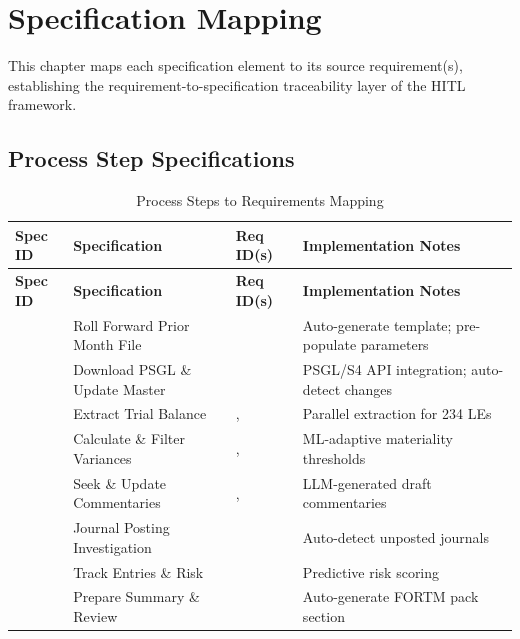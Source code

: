 \chapter{Specification Mapping}
\label{ch:specification-mapping}

This chapter maps each specification element to its source requirement(s),
establishing the requirement-to-specification traceability layer of the
HITL framework.

\section{Process Step Specifications}
\label{sec:process-step-specs}

\begin{longtable}{@{}C{2cm}L{3.5cm}C{3cm}L{5cm}@{}}
\caption{Process Steps to Requirements Mapping}
\label{tab:process-steps-mapping} \\
\toprule
\textbf{Spec ID} & \textbf{Specification} & \textbf{Req ID(s)} & \textbf{Implementation Notes} \\
\midrule
\endfirsthead
\toprule
\textbf{Spec ID} & \textbf{Specification} & \textbf{Req ID(s)} & \textbf{Implementation Notes} \\
\midrule
\endhead
{} & Roll Forward Prior Month File &  & Auto-generate template; pre-populate parameters \\
 & Download PSGL \& Update Master &  & PSGL/S4 API integration; auto-detect changes \\
 & Extract Trial Balance & ,  & Parallel extraction for 234 LEs \\
 & Calculate \& Filter Variances & ,  & ML-adaptive materiality thresholds \\
 & Seek \& Update Commentaries & ,  & LLM-generated draft commentaries \\
 & Journal Posting Investigation &  & Auto-detect unposted journals \\
 & Track Entries \& Risk &  & Predictive risk scoring \\
 & Prepare Summary \& Review &  & Auto-generate FORTM pack section \\
\bottomrule
\end{longtable}

